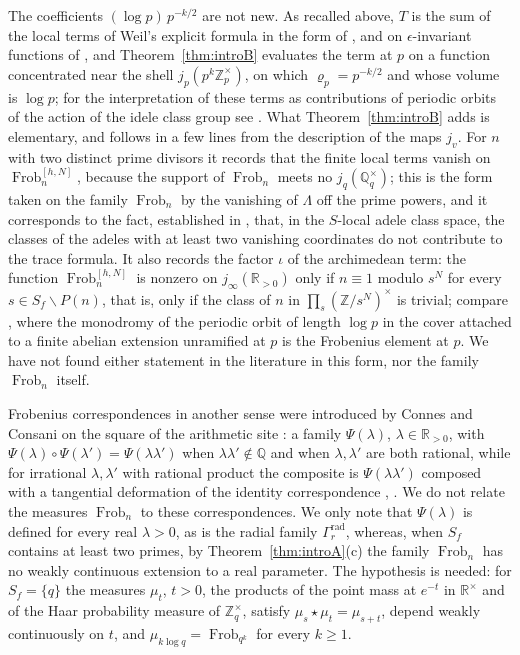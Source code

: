 \documentclass[11pt]{amsart}
\theoremstyle{definition}
\newcommand{\R}{\mathbb R}
\newcommand{\Z}{\mathbb Z}
\newcommand{\Q}{\mathbb Q}
\newcommand{\Frob}{\operatorname{Frob}}
\begin{document}
The coefficients $(\log p)\,p^{-k/2}$ are not new. As recalled above, $T$ is
the sum of the local terms of Weil's explicit formula in the form of
\cite[Appendix~II]{Connes99}, and on $\epsilon$-invariant functions of
\cite[Theorem~4]{Connes99}, and Theorem~\ref{thm:introB} evaluates the term
at $p$ on a function concentrated near the shell $j_p(p^k\Z_p^\times)$, on
which $\varrho_p=p^{-k/2}$ and whose volume is $\log p$; for the
interpretation of these terms as contributions of periodic orbits of the
action of the idele class group see \cite[Sections~IV and~VI]{Connes99}.
What Theorem~\ref{thm:introB} adds is elementary, and follows in a few
lines from the description of the maps $j_v$. For $n$ with two distinct
prime divisors it records that the finite local terms vanish on
$\Frob_n^{[h,N]}$, because the support of $\Frob_n$ meets no
$j_q(\Q_q^\times)$; this is the form taken on the family $\Frob_n$ by the
vanishing of $\Lambda$ off the prime powers, and it corresponds to the fact,
established in \cite[Section~VII]{Connes99}, that, in the $S$-local adele
class space, the classes of the adeles with at least two vanishing
coordinates do not contribute to the trace formula. It also records the factor $\iota$ of the archimedean term: the
function $\Frob_n^{[h,N]}$ is nonzero on $j_\infty(\R_{>0})$ only if
$n\equiv1$ modulo $s^N$ for every $s\in S_f\smallsetminus P(n)$, that is,
only if the class of $n$ in $\prod_s(\Z/s^N)^\times$ is trivial; compare
\cite[Theorem~1]{CCKnots}, where the monodromy of the periodic orbit of
length $\log p$ in the cover attached to a finite abelian extension unramified at $p$ is the
Frobenius element at $p$. We have not found either statement in the
literature in this form, nor the family $\Frob_n$ itself.

Frobenius correspondences in another sense were introduced by Connes and
Consani on the square of the arithmetic site
\cite{CCArithSite,CCGeomArith}: a family $\Psi(\lambda)$,
$\lambda\in\R_{>0}$, with
$\Psi(\lambda)\circ\Psi(\lambda')=\Psi(\lambda\lambda')$ when
$\lambda\lambda'\notin\Q$ and when $\lambda,\lambda'$ are both rational,
while for irrational $\lambda,\lambda'$ with rational product the composite
is $\Psi(\lambda\lambda')$ composed with a tangential deformation of the
identity correspondence \cite[Theorem~4.3]{CCArithSite},
\cite[Theorems~1.2 and~7.7]{CCGeomArith}. We do not relate the measures
$\Frob_n$ to these correspondences. We only note that $\Psi(\lambda)$ is
defined for every real $\lambda>0$, as is the radial family
$\Gamma_r^{\mathrm{rad}}$, whereas, when $S_f$ contains at least two primes,
by Theorem~\ref{thm:introA}(c) the family $\Frob_n$ has no weakly continuous
extension to a real parameter. The hypothesis is needed: for $S_f=\{q\}$ the
measures $\mu_t$, $t>0$, the products of the point mass at $e^{-t}$ in
$\R^\times$ and of the Haar probability measure of $\Z_q^\times$, satisfy
$\mu_s\star\mu_t=\mu_{s+t}$, depend weakly continuously on $t$, and
$\mu_{k\log q}=\Frob_{q^k}$ for every $k\ge1$.
\end{document}

